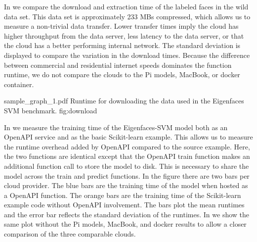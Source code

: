 In  we compare the download and extraction time
of the labeled faces in the wild data set. This data set is
approximately 233 MBs compressed, which allows us to measure a
non-trivial data transfer.  Lower transfer times imply the cloud has
higher throughput from the data server, less latency to the data
server, or that the cloud has a better performing internal
network. The standard deviation is displayed to compare the variation
in the download times. Because the difference between commercial and
residential internet speeds dominates the function runtime, we do not
compare the clouds to the Pi models, MacBook, or docker container.

\OneFIGURE
    {sample_graph_1.pdf}
    {Runtime for downloading the data used in the Eigenfaces SVM benchmark.}
    {fig:download}
    
In  we measure the training time of the
Eigenfaces-SVM model both as an OpenAPI service and as the basic
Scikit-learn example. This allows us to measure the runtime overhead
added by OpenAPI compared to the source example. Here, the two
functions are identical except that the OpenAPI train function makes
an additional function call to store the model to disk. This is
necessary to share the model across the train and predict
functions. In the figure there are two bars per cloud provider. The
blue bars are the training time of the model when hosted as
a \Cloudmesh OpenAPI function. The orange bars are the training time
of the Scikit-learn example code without \Cloudmesh OpenAPI
involvement. The bars plot the mean runtimes and the error bar
reflects the standard deviation of the runtimes. In 
we show the same plot without the Pi models, MacBook, and docker
results to allow a closer comparison of the three comparable clouds.

